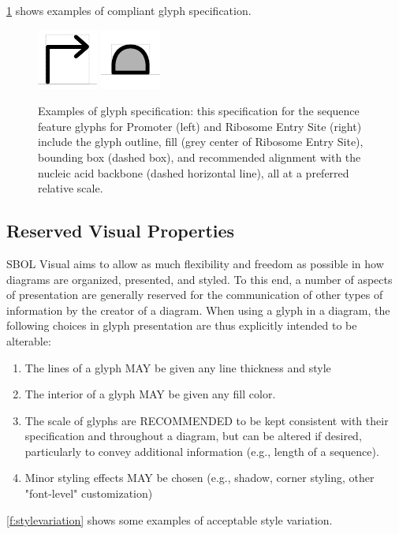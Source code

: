 \ref{f:specexample} shows examples of compliant glyph specification.

\begin{figure}[h!]
\centering
\includegraphics[scale=2.0]{figures/promoter-specification.pdf}
\includegraphics[scale=2.0]{figures/ribosome-entry-site-specification.pdf}
\caption{Examples of glyph specification: this specification for the sequence feature glyphs for Promoter (left) and Ribosome Entry Site (right) include the glyph outline, fill (grey center of Ribosome Entry Site), bounding box (dashed box), and recommended alignment with the nucleic acid backbone (dashed horizontal line), all at a preferred relative scale.}
\label{f:specexample}
\end{figure}

\subsection{Reserved Visual Properties}

SBOL Visual aims to allow as much flexibility and freedom as possible in how diagrams are organized, presented, and styled.
%
To this end, a number of aspects of presentation are generally reserved for the communication of other types of information by the creator of a diagram.
%
When using a glyph in a diagram, the following choices in glyph presentation are thus explicitly intended to be alterable:
\begin{enumerate}
\item The lines of a glyph MAY be given any line thickness and style
\item The interior of a glyph MAY be given any fill color.
\item The scale of glyphs are RECOMMENDED to be kept consistent with their specification and throughout a diagram, but can be altered if desired, particularly to convey additional information (e.g., length of a sequence).
\item Minor styling effects MAY be chosen (e.g., shadow, corner styling, other "font-level" customization)
\end{enumerate}
\ref{f:stylevariation} shows some examples of acceptable style variation.

